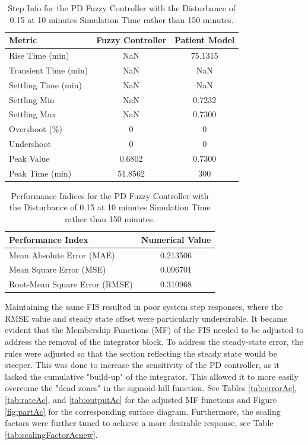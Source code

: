 \documentclass[12pt]{article}
\begin{document}
\begin{table}[H]
\centering
\begin{tabular}{|l|c|c|}
\hline
\textbf{Metric} & \textbf{Fuzzy Controller} & \textbf{Patient Model} \\ \hline
Rise Time (min) & NaN & 75.1315 \\ \hline
Transient Time (min) & NaN & NaN \\ \hline
Settling Time (min) & NaN & NaN \\ \hline
Settling Min & NaN & 0.7232 \\ \hline
Settling Max & NaN & 0.7300 \\ \hline
Overshoot (\%) & 0 & 0 \\ \hline
Undershoot & 0 & 0 \\ \hline
Peak Value & 0.6802 & 0.7300 \\ \hline
Peak Time (min) & 51.8562 & 300 \\ \hline
\end{tabular}
\caption{Step Info for the PD Fuzzy Controller with the Disturbance of 0.15 at 10 minutes Simulation Time rather than 150 minutes. }
\label{tab:characteristicsAcdisturb}
\end{table}

\begin{table}[H]
\centering
\begin{tabular}{|l|c|}
\hline
\textbf{Performance Index} & \textbf{Numerical Value} \\ \hline
Mean Absolute Error (MAE) & 0.213506 \\ \hline
Mean Square Error (MSE) & 0.096701 \\ \hline
Root-Mean Square Error (RMSE) &  0.310968 \\ \hline
\end{tabular}
\caption{Performance Indices for the PD Fuzzy Controller with the Disturbance of 0.15 at 10 minutes Simulation Time rather than 150 minutes.}
\label{tab:performanceAcdisturb}
\end{table}

Maintaining the same FIS resulted in poor system step responses, where the RMSE value and steady state offset were particularly undersirable.
It became evident that the Membership Functions (MF) of the FIS needed to be adjusted to address the removal of the integrator block. 
To address the steady-state error, the rules were adjusted so that the section reflecting the steady state would be steeper. 
This was done to increase the sensitivity of the PD controller, as it lacked the cumulative "build-up" of the integrator.
This allowed it to more easily overcome the "dead zones" in the sigmoid-hill function.
See Tables \ref{tab:errorAc}, \ref{tab:rateAc}, and \ref{tab:outputAc} for the adjusted MF functions and Figure \ref{fig:partAc} for the corresponding surface diagram.
Furthermore, the scaling factors were further tuned to achieve a more desirable response, see Table \ref{tab:scalingFactorAcnew}.
\\
\end{document}
